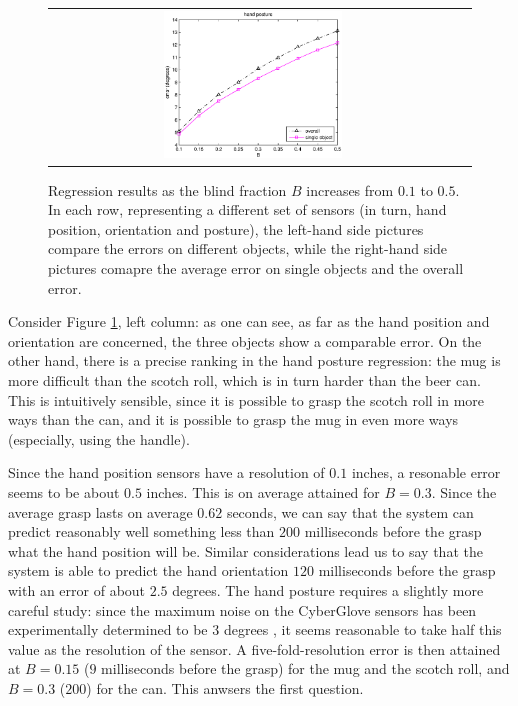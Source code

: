 \begin{figure}[htbp]
\begin{center}
\begin{tabular}{cc}
      \includegraphics[width=0.45\textwidth]{error_cmp_pst.eps} \\
    \end{tabular}
    \caption{Regression results as the blind fraction $B$ increases
    from $0.1$ to $0.5$. In each row, representing a different set of
    sensors (in turn, hand position, orientation and posture), the
    left-hand side pictures compare the errors on different objects,
    while the right-hand side pictures comapre the average error on
    single objects and the overall error.}
    \label{fig:err_all}
  \end{center}
\end{figure}

Consider Figure \ref{fig:err_all}, left column: as one can see, as far
as the hand position and orientation are concerned, the three objects
show a comparable error. On the other hand, there is a precise ranking
in the hand posture regression: the mug is more difficult than the
scotch roll, which is in turn harder than the beer can. This is
intuitively sensible, since it is possible to grasp the scotch roll in
more ways than the can, and it is possible to grasp the mug in even
more ways (especially, using the handle).

Since the hand position sensors have a resolution of $0.1$ inches, a
resonable error seems to be about $0.5$ inches. This is on average
attained for $B=0.3$. Since the average grasp lasts on average $0.62$
seconds, we can say that the system can predict reasonably well
something less than $200$ milliseconds before the grasp what the hand
position will be. Similar considerations lead us to say that the
system is able to predict the hand orientation $120$ milliseconds before
the grasp with an error of about $2.5$ degrees. The hand posture
requires a slightly more careful study: since the maximum noise on the
CyberGlove sensors has been experimentally determined to be $3$
degrees \cite{212431}, it seems reasonable to take half this value as
the resolution of the sensor. A five-fold-resolution error is then
attained at $B=0.15$ ($9$ milliseconds before the grasp) for the mug
and the scotch roll, and $B=0.3$ ($200$) for the can. This anwsers the
first question.

